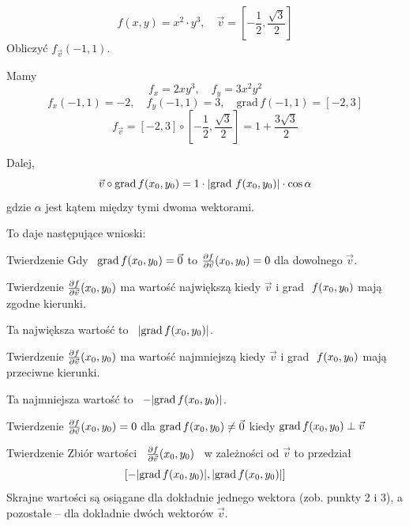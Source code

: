 \begin{przyklad}
    \[ f(x,y) = x^2 \cdot y^3, \quad \vec{v} =\left[ -\frac{1}{2}, \frac{\sqrt{3}}{2} \right] \]
    Obliczyć $ f_{\vec{v}} (-1, 1) $. \bigskip

    Mamy
    \[ f_x = 2xy^3, \quad f_y = 3x^2 y^2 \]
    \[ f_x(-1, 1) = -2, \quad f_y(-1, 1) = 3, \quad \text{grad}\, f(-1, 1) = [-2, 3] \]
    \[ f_{\vec{v}} = [-2, 3] \circ \left[ -\frac{1}{2}, \frac{\sqrt{3}}{2} \right] = 1 + \frac{3 \sqrt{3}}{2} \]
\end{przyklad}

Dalej,
\[ \vec{v} \circ \text{grad}\, f(x_0, y_0) = 1 \cdot | \text{grad}\ f(x_0, y_0) | \cdot \cos \alpha \]
gdzie $\alpha$ jest kątem między tymi dwoma wektorami.

To daje następujące wnioski:

\begin{tw}{Twierdzenie}
    Gdy \ $ \text{grad} \, f(x_0, y_0) = \vec{0} $
    \quad to \quad
    $ \frac{\partial f}{\partial \vec{v}} (x_0, y_0) = 0 $
    \quad dla dowolnego $ \vec{v} $.
\end{tw}

\begin{tw}{Twierdzenie}
    $ \frac{\partial f}{\partial \vec{v}} (x_0, y_0) $ ma wartość największą kiedy $\vec{v}$ i grad $\ f(x_0, y_0) $ mają zgodne kierunki.

    Ta największa wartość to \ $ | \text{grad}\, f(x_0, y_0) | $.
\end{tw}

\begin{tw}{Twierdzenie}
    $ \frac{\partial f}{\partial \vec{v}} (x_0, y_0) $ ma wartość najmniejszą kiedy $\vec{v}$ i grad $\ f(x_0, y_0) $ mają przeciwne kierunki.

    Ta najmniejsza wartość to \ $ -| \text{grad}\, f(x_0, y_0) | $.
\end{tw}

\begin{tw}{Twierdzenie}
    $ \frac{\partial f}{\partial \vec{v}} (x_0, y_0) = 0 $ \quad dla \quad $ \text{grad} \, f(x_0, y_0) \neq \vec{0} $
    \quad kiedy \quad
    $ \text{grad} \, f(x_0, y_0) \perp \vec{v} $
\end{tw}

\begin{tw}{Twierdzenie}
    Zbiór wartości \ $ \frac{\partial f}{\partial \vec{v}} (x_0, y_0) $ \ w zależności od $\vec{v}$ to przedział
    \[ [ -|\text{grad} \, f(x_0, y_0)|, |\text{grad} \, f(x_0, y_0) | ] \]
    Skrajne wartości są osiągane dla dokładnie jednego wektora (zob. punkty 2 i 3), a pozostałe -- dla dokładnie dwóch wektorów $\vec{v}$.
\end{tw}

